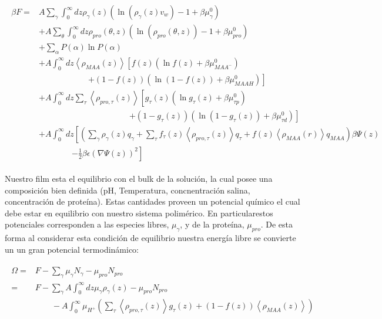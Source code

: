 \begin{align}
	\begin{aligned}
		\beta F=  & A\sum_{\gamma}\int_0^\infty{dz\rho_\gamma(z)\left(\ln \left(\rho_\gamma (z)v_w\right) -1 + \beta\mu^0_\gamma\right)} \\
		&+ A\sum_{\theta}\int_0^\infty{dz\rho_{pro}(\theta,z)\left(\ln \left(\rho_{pro}(\theta,z)\right) -1 + \beta\mu^0_{pro} \right)} \\
		&+ \sum_\alpha{P(\alpha)\ln P(\alpha)} \\
		& + A\int_0^\infty dz \left<\rho_{MAA}(z)\right> \left[f(z)(\ln f(z)+ \beta\mu^0_{MAA^-})\right.\\
		& \qquad\qquad\qquad \left.+(1-f(z))(\ln (1-f(z))+\beta\mu^0_{MAAH})\right] \\
		& + A\int_0^\infty dz \sum_\tau \left<\rho_{pro,\tau}(z)\right> \left[g_\tau(z)(\ln g_\tau(z)+ \beta\mu^0_{\tau p})\right.\\
		&\qquad \qquad \qquad\qquad \qquad\quad \left.+(1-g_\tau(z))(\ln (1-g_\tau(z))+\beta\mu^0_{\tau d})\right]   \\
		 & +A\int_0^\infty dz \left[\left(\sum_{\gamma } {\rho_\gamma(z) q_\gamma + \sum_\tau{f_\tau(z) \left<\rho_{pro,\tau}(z)\right> q_\tau} +  f(z)\left<\rho_{MAA}(r)\right>q_{MAA}}\right)\beta\Psi(z) \right. \\ & \qquad \qquad \left.-\frac{1}{2}\beta\epsilon(\nabla\Psi(z))^2 \right]
		\end{aligned}
\end{align}


Nuestro film esta el equilibrio con el bulk de la soluci\'on, la cual posee una composici\'on bien definida (pH, Temperatura, concnentraci\'on salina,  concentraci\'on de prote\'ina). Estas cantidades proveen un potencial qu\'imico el cual debe estar en equilibrio con nuestro sistema polim\'erico. En particularestos potenciales corresponden a las especies libres, $\mu_\gamma$, y de la prote\'ina, $\mu_{pro}$.
De esta forma al considerar esta condici\'on de equilibrio nuestra energ\'ia libre se convierte un un gran potencial termodin\'amico:

\begin{align}
	\begin{aligned}
		\Omega = &F - \sum_\gamma \mu_\gamma N_\gamma -  \mu_{pro} N_{pro} \\
			= &F -\sum_\gamma A\int_0^\infty dz \mu_\gamma \rho_\gamma(z) -  \mu_{pro} N_{pro}  \\
			& \qquad -A\int_0^\infty \mu_{H^+} \left( \sum_\tau\left< \rho_{pro,\tau}(z) \right>g_\tau(z) + (1-f(z))\left< \rho_{MAA}(z) \right> \right )
			\end{aligned}
		\label{eq:film:equil-qco}
\end{align}

